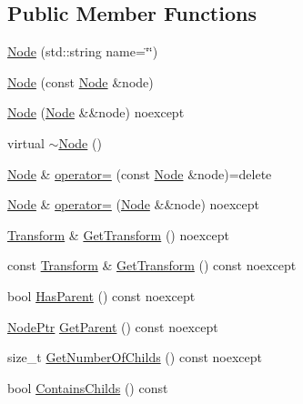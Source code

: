 \subsection*{Public Member Functions}
\begin{DoxyCompactItemize}
\item 
\mbox{\hyperlink{classmage_1_1_node_af546b12ffaefe122e59163b720d472cc}{Node}} (std\+::string name=\char`\"{}\char`\"{})
\item 
\mbox{\hyperlink{classmage_1_1_node_af9da591163469f210895f3a5b389d7cc}{Node}} (const \mbox{\hyperlink{classmage_1_1_node}{Node}} \&node)
\item 
\mbox{\hyperlink{classmage_1_1_node_a848ecb05c6b085cb4f27e38add85e64c}{Node}} (\mbox{\hyperlink{classmage_1_1_node}{Node}} \&\&node) noexcept
\item 
virtual \mbox{\hyperlink{classmage_1_1_node_a1369fc11b331abacbaf11aeb5729e871}{$\sim$\+Node}} ()
\item 
\mbox{\hyperlink{classmage_1_1_node}{Node}} \& \mbox{\hyperlink{classmage_1_1_node_ad10ea13608963acfa06d3c1577314da5}{operator=}} (const \mbox{\hyperlink{classmage_1_1_node}{Node}} \&node)=delete
\item 
\mbox{\hyperlink{classmage_1_1_node}{Node}} \& \mbox{\hyperlink{classmage_1_1_node_a10d0ed7f0ade94ce7cbd6f413ae82757}{operator=}} (\mbox{\hyperlink{classmage_1_1_node}{Node}} \&\&node) noexcept
\item 
\mbox{\hyperlink{classmage_1_1_transform}{Transform}} \& \mbox{\hyperlink{classmage_1_1_node_ad087f43f468552c7d4e2a4ea605b0220}{Get\+Transform}} () noexcept
\item 
const \mbox{\hyperlink{classmage_1_1_transform}{Transform}} \& \mbox{\hyperlink{classmage_1_1_node_aa8e2a3e9361dbdb4be23a8986f4ef082}{Get\+Transform}} () const noexcept
\item 
bool \mbox{\hyperlink{classmage_1_1_node_a2c1fe63ec1cb15321f0b0f5879227dcd}{Has\+Parent}} () const noexcept
\item 
\mbox{\hyperlink{classmage_1_1_node_ac575dc006e0ae1134277ade977dc06b6}{Node\+Ptr}} \mbox{\hyperlink{classmage_1_1_node_add9389d951ae864d7f92261398297089}{Get\+Parent}} () const noexcept
\item 
size\+\_\+t \mbox{\hyperlink{classmage_1_1_node_a975d92d3d93fe00d748c341198ddf02c}{Get\+Number\+Of\+Childs}} () const noexcept
\item 
bool \mbox{\hyperlink{classmage_1_1_node_afd885043a9de1b0c09d1eb0ef7bf6006}{Contains\+Childs}} () const
\item 

\end{DoxyCompactItemize}
